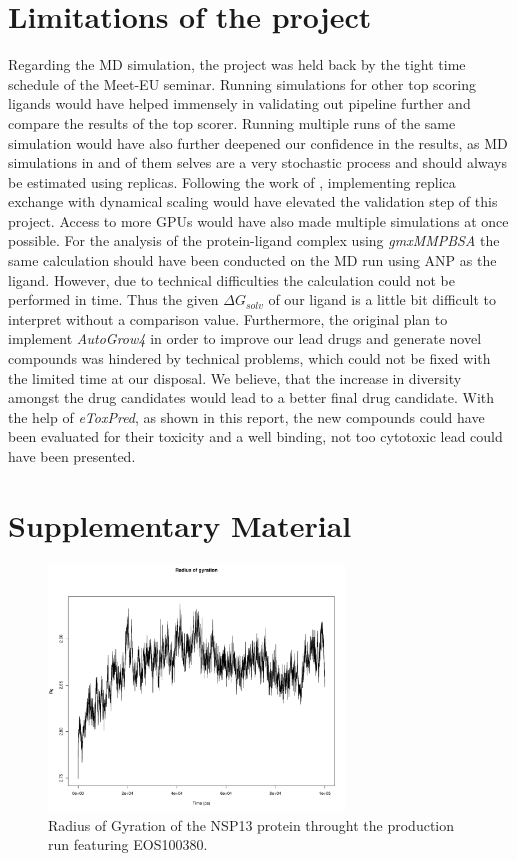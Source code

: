 \documentclass[11pt, letterpaper, titlepage]{article}
\renewcommand{\cite}{\parencite}
\begin{document}
\section{Limitations of the project}
Regarding the \acf{MD} simulation, the project was held back by the tight time schedule of the Meet-EU seminar. Running simulations for other top scoring ligands would have helped immensely in validating out pipeline further and compare the results of the top scorer. Running multiple runs of the same simulation would have also further deepened our confidence in the results, as MD simulations in and of them selves are a very stochastic process and should always be estimated using replicas. Following the work of \textcite{REDS}, implementing replica exchange with dynamical scaling would have elevated the validation step of this project. Access to more GPUs would have also made multiple simulations at once possible.
For the analysis of the protein-ligand complex using \textit{gmxMMPBSA} the same calculation should have been conducted on the MD run using ANP as the ligand. However, due to technical difficulties the calculation could not be performed in time. Thus the given $\Delta G_{solv}$ of our ligand is a little bit difficult to interpret without a comparison value.
Furthermore, the original plan to implement \textit{AutoGrow4} \cite{packageAutogrow4} in order to improve our lead drugs and generate novel compounds was hindered by technical problems, which could not be fixed with the limited time at our disposal. We believe, that the increase in diversity amongst the drug candidates would lead to a better final drug candidate. With the help of \textit{eToxPred}, as shown in this report, the new compounds could have been evaluated for their toxicity and a well binding, not too cytotoxic lead could have been presented. 

\pagebreak
\section{Supplementary Material}

\setcounter{figure}{0}
\renewcommand{\thefigure}{S\arabic{figure}}
\begin{figure}[h]
  \begin{center}
    \includegraphics[width=0.7\textwidth]{gyration_protein.pdf}
  \end{center}
  \caption{Radius of Gyration of the NSP13 protein throught the production run featuring EOS100380.}\label{gyr}
\end{figure}
\end{document}
